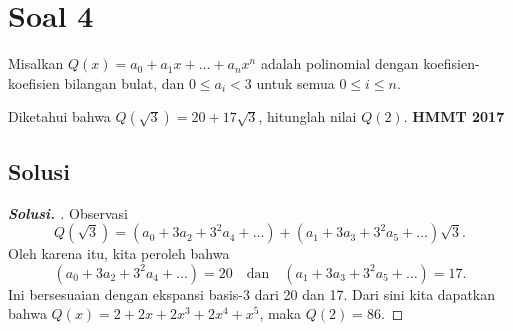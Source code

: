 \documentclass[11pt]{scrartcl}
\begin{document}
\newpage
\section{Soal 4} Misalkan $Q(x) = a_0 + a_1x + \dots + a_nx^n$ adalah polinomial dengan koefisien-koefisien bilangan bulat, dan $0 \le a_i < 3$ untuk semua $0 \le i \le n$.

Diketahui bahwa $Q(\sqrt{3}) = 20 + 17\sqrt{3}$, hitunglah nilai $Q(2)$.
\newline
\textbf{HMMT 2017}

\subsection{Solusi}
\begin{proof}[\textbf{Solusi. }] 
Observasi
\[ Q(\sqrt{3}) = (a_0 + 3a_2 + 3^2a_4 + \dots) + (a_1 + 3a_3 + 3^2a_5 + \dots)\sqrt{3}. \]
Oleh karena itu, kita peroleh bahwa
\[ (a_0 + 3a_2 + 3^2a_4 + \dots) = 20 \quad \text{dan} \quad (a_1 + 3a_3 + 3^2a_5 + \dots) = 17. \]
Ini bersesuaian dengan ekspansi basis-3 dari 20 dan 17. Dari sini kita dapatkan bahwa $Q(x) = 2+2x+2x^3+2x^4+x^5$, maka $Q(2) = 86$.
\end{proof}
\end{document}
